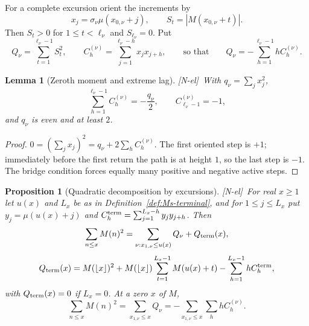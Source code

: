 \documentclass[11pt]{amsart}
\numberwithin{equation}{section}
\theoremstyle{plain}
\newtheorem{proposition}[theorem]{Proposition}
\newtheorem{lemma}[theorem]{Lemma}
\theoremstyle{definition}
\theoremstyle{remark}
\newcommand{\tagNE}{\textup{[N-el]}}
\begin{document}
For a complete excursion orient the increments by
\begin{equation}
\label{eq:orientation}
x_j=\sigma_\nu\mu(x_{0,\nu}+j),\qquad
S_t=|M(x_{0,\nu}+t)|.
\end{equation}
Then $S_t>0$ for $1\le t<\ell_\nu$ and $S_{\ell_\nu}=0$. Put
\begin{equation}
\label{eq:Q_def}
Q_\nu=\sum_{t=1}^{\ell_\nu-1}S_t^2,\qquad
C_h^{(\nu)}=\sum_{j=1}^{\ell_\nu-h}x_jx_{j+h},
\qquad\text{so that}\qquad
Q_\nu=-\sum_{h=1}^{\ell_\nu-1}hC_h^{(\nu)}.
\end{equation}

\begin{lemma}[Zeroth moment and extreme lag]
\label{lem:zeroth-corr}
\tagNE\ With $q_\nu=\sum_jx_j^2$,
\begin{equation}
\label{eq:zeroth-corr}
\sum_{h=1}^{\ell_\nu-1}C_h^{(\nu)}=-\frac{q_\nu}{2},\qquad
C_{\ell_\nu-1}^{(\nu)}=-1,
\end{equation}
and $q_\nu$ is even and at least $2$.
\end{lemma}

\begin{proof}
$0=(\sum_jx_j)^2=q_\nu+2\sum_hC_h^{(\nu)}$. The first oriented step is $+1$;
immediately before the first return the path is at height $1$, so the last
step is $-1$. The bridge condition forces equally many positive and negative
active steps.
\end{proof}

\begin{proposition}[Quadratic decomposition by excursions]
\label{prop:quadratic-decomp}
\tagNE\ For real $x\ge1$ let $u(x)$ and $L_x$ be as in
Definition~\ref{def:Ms-terminal}, and for $1\le j\le L_x$ put
$y_j=\mu(u(x)+j)$ and $C_h^{\rm term}=\sum_{j=1}^{L_x-h}y_jy_{j+h}$. Then
\begin{equation}
\label{eq:quadratic-decomp-general}
\sum_{n\le x}M(n)^2
=\sum_{\nu:x_{1,\nu}\le u(x)}Q_\nu+Q_{\rm term}(x),
\end{equation}
\begin{equation}
\label{eq:terminal-Q-exact}
Q_{\rm term}(x)=M(\lfloor x\rfloor)^2
+M(\lfloor x\rfloor)\sum_{t=1}^{L_x-1}M(u(x)+t)
-\sum_{h=1}^{L_x-1}hC_h^{\rm term},
\end{equation}
with $Q_{\rm term}(x)=0$ if $L_x=0$. At a zero $x$ of $M$,
\begin{equation}
\label{eq:quadratic-decomp-zero}
\sum_{n\le x}M(n)^2
=\sum_{x_{1,\nu}\le x}Q_\nu
=-\sum_{x_{1,\nu}\le x}\sum_hhC_h^{(\nu)}.
\end{equation}
\end{proposition}
\end{document}

